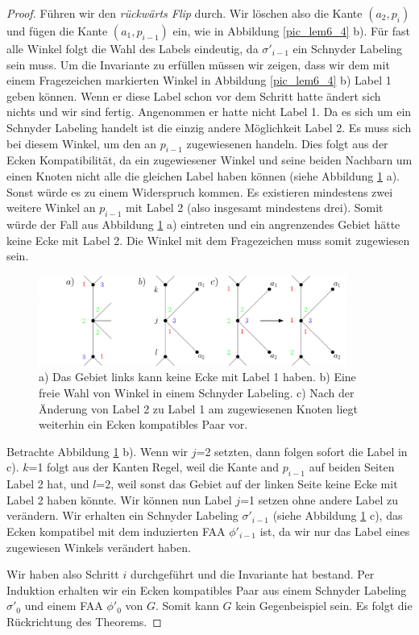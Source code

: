 \begin{proof}
Führen wir den \textit{rückwärts Flip} durch. Wir löschen also die Kante $(a_2,p_i)$ und fügen die Kante $(a_1,p_{i-1})$ ein, wie in Abbildung \ref{pic_lem6_4} b). Für fast alle Winkel folgt die Wahl des Labels eindeutig, da $\sigma'_{i-1}$ ein Schnyder Labeling sein muss. Um die Invariante zu erfüllen müssen wir zeigen, dass wir dem mit einem Fragezeichen markierten Winkel in Abbildung \ref{pic_lem6_4} b) Label 1 geben können. Wenn er diese Label schon vor dem Schritt hatte ändert sich nichts und wir sind fertig. Angenommen er hatte nicht Label 1. Da es sich um ein Schnyder Labeling handelt ist die einzig andere Möglichkeit Label 2. Es muss sich bei diesem Winkel, um den an $p_{i-1}$ zugewiesenen handeln. Dies folgt aus der Ecken Kompatibilität, da ein zugewiesener Winkel und seine beiden Nachbarn um einen Knoten nicht alle die gleichen Label haben können (siehe Abbildung \ref{pic_lem6_5} a). Sonst würde es zu einem Widerspruch kommen. Es existieren mindestens zwei weitere Winkel an $p_{i-1}$ mit Label 2 (also insgesamt mindestens drei). Somit würde der Fall aus Abbildung \ref{pic_lem6_5} a) eintreten und ein angrenzendes Gebiet hätte keine Ecke mit Label 2. Die Winkel mit dem Fragezeichen muss somit zugewiesen sein.

\begin{figure}[h]
	\centering
	  \includegraphics[width=0.9\textwidth]{lem6_5.png}
    	\caption{a) Das Gebiet links kann keine Ecke mit Label 1 haben. b) Eine freie Wahl von Winkel in einem Schnyder Labeling. c) Nach der Änderung von Label 2 zu Label 1 am zugewiesenen Knoten liegt weiterhin ein Ecken kompatibles Paar vor.}
    	\label{pic_lem6_5}
\end{figure}

Betrachte Abbildung \ref{pic_lem6_5} b). Wenn wir $j$=2 setzten, dann folgen sofort die Label in c). $k$=1 folgt aus der Kanten Regel, weil die Kante and $p_{i-1}$ auf beiden Seiten Label 2 hat, und $l$=2, weil sonst das Gebiet auf der linken Seite keine Ecke mit Label 2 haben könnte. Wir können nun Label $j$=1 setzen ohne andere Label zu verändern. Wir erhalten ein Schnyder Labeling $\sigma'_{i-1}$ (siehe Abbildung \ref{pic_lem6_5} c), das Ecken kompatibel mit dem induzierten FAA $\phi'_{i-1}$ ist, da wir nur das Label eines zugewiesen Winkels verändert haben.

Wir haben also Schritt $i$ durchgeführt und die Invariante hat bestand. Per Induktion erhalten wir ein Ecken kompatibles Paar aus einem Schnyder Labeling $\sigma'_0$ und einem FAA $\phi'_0$ von $G$. Somit kann $G$ kein Gegenbeispiel sein. Es folgt die Rückrichtung des Theorems.
\end{proof}


